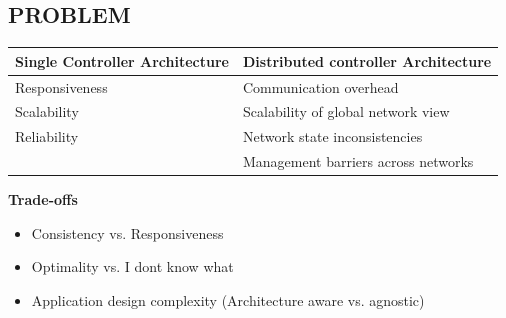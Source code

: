 \documentclass[portrait,a1]{a0poster}
\begin{document}
\begin{multicols}{2}
%
%
%
%

\color{SaddleBrown}%
\section*{PROBLEM}
\color{DarkSlateGray}
\begin{tabular} {l | l}
    \textbf{Single Controller Architecture} & \textbf{Distributed controller Architecture} \\
    \hline
    Responsiveness & Communication overhead \\
       Scalability & Scalability of global network view \\
       Reliability & Network state inconsistencies \\
                   & Management barriers across networks
\end{tabular}

\textbf{Trade-offs}
\begin{itemize}
    \item Consistency vs. Responsiveness
    \item Optimality vs. I dont know what
    \item Application design complexity (Architecture aware vs. agnostic)\\
\end{itemize}


\end{multicols}
\end{document}
